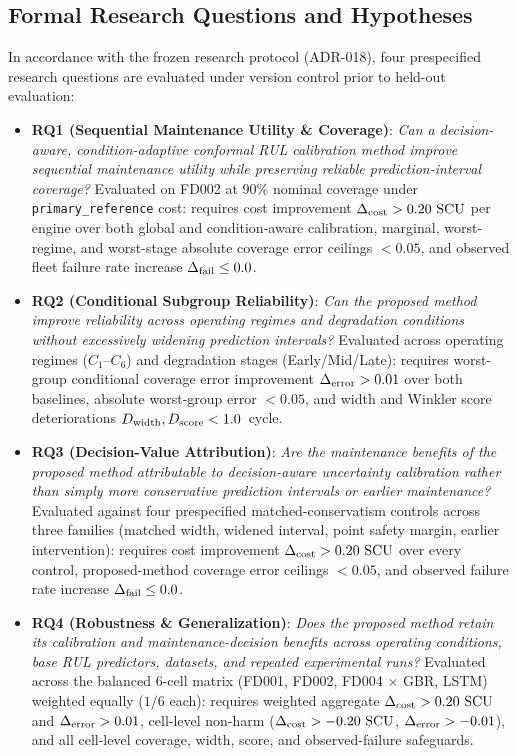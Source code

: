 \subsection{Formal Research Questions and Hypotheses}
In accordance with the frozen research protocol (ADR-018), four prespecified research questions are evaluated under version control prior to held-out evaluation:
\begin{itemize}
  \item \textbf{RQ1 (Sequential Maintenance Utility \& Coverage)}: \textit{Can a decision-aware, condition-adaptive conformal RUL calibration method improve sequential maintenance utility while preserving reliable prediction-interval coverage?}
  Evaluated on FD002 at 90\% nominal coverage under \texttt{primary\_reference} cost: requires cost improvement $\Delta_{\text{cost}} > 0.20~\text{SCU}$ per engine over both global and condition-aware calibration, marginal, worst-regime, and worst-stage absolute coverage error ceilings $< 0.05$, and observed fleet failure rate increase $\Delta_{\text{fail}} \le 0.0$.
  \item \textbf{RQ2 (Conditional Subgroup Reliability)}: \textit{Can the proposed method improve reliability across operating regimes and degradation conditions without excessively widening prediction intervals?}
  Evaluated across operating regimes ($C_1$--$C_6$) and degradation stages (Early/Mid/Late): requires worst-group conditional coverage error improvement $\Delta_{\text{error}} > 0.01$ over both baselines, absolute worst-group error $< 0.05$, and width and Winkler score deteriorations $D_{\text{width}}, D_{\text{score}} < 1.0$~cycle.
  \item \textbf{RQ3 (Decision-Value Attribution)}: \textit{Are the maintenance benefits of the proposed method attributable to decision-aware uncertainty calibration rather than simply more conservative prediction intervals or earlier maintenance?}
  Evaluated against four prespecified matched-conservatism controls across three families (matched width, widened interval, point safety margin, earlier intervention): requires cost improvement $\Delta_{\text{cost}} > 0.20~\text{SCU}$ over every control, proposed-method coverage error ceilings $< 0.05$, and observed failure rate increase $\Delta_{\text{fail}} \le 0.0$.
  \item \textbf{RQ4 (Robustness \& Generalization)}: \textit{Does the proposed method retain its calibration and maintenance-decision benefits across operating conditions, base RUL predictors, datasets, and repeated experimental runs?}
  Evaluated across the balanced 6-cell matrix (FD001, FD002, FD004 $\times$ GBR, LSTM) weighted equally ($1/6$ each): requires weighted aggregate $\Delta_{\text{cost}} > 0.20~\text{SCU}$ and $\Delta_{\text{error}} > 0.01$, cell-level non-harm ($\Delta_{\text{cost}} > -0.20~\text{SCU}$, $\Delta_{\text{error}} > -0.01$), and all cell-level coverage, width, score, and observed-failure safeguards.
\end{itemize}
